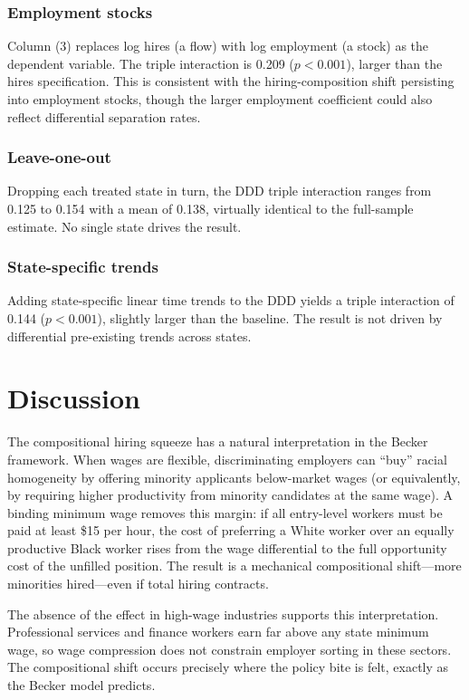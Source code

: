 \documentclass[12pt]{article}
\begin{document}
\subsubsection*{Employment stocks} Column (3) replaces log hires (a flow) with log employment (a stock) as the dependent variable. The triple interaction is 0.209 ($p < 0.001$), larger than the hires specification. This is consistent with the hiring-composition shift persisting into employment stocks, though the larger employment coefficient could also reflect differential separation rates.

\subsubsection*{Leave-one-out} Dropping each treated state in turn, the DDD triple interaction ranges from 0.125 to 0.154 with a mean of 0.138, virtually identical to the full-sample estimate. No single state drives the result.

\subsubsection*{State-specific trends} Adding state-specific linear time trends to the DDD yields a triple interaction of 0.144 ($p < 0.001$), slightly larger than the baseline. The result is not driven by differential pre-existing trends across states.


\section{Discussion}

The compositional hiring squeeze has a natural interpretation in the Becker framework. When wages are flexible, discriminating employers can ``buy'' racial homogeneity by offering minority applicants below-market wages (or equivalently, by requiring higher productivity from minority candidates at the same wage). A binding minimum wage removes this margin: if all entry-level workers must be paid at least \$15 per hour, the cost of preferring a White worker over an equally productive Black worker rises from the wage differential to the full opportunity cost of the unfilled position. The result is a mechanical compositional shift---more minorities hired---even if total hiring contracts.

The absence of the effect in high-wage industries supports this interpretation. Professional services and finance workers earn far above any state minimum wage, so wage compression does not constrain employer sorting in these sectors. The compositional shift occurs precisely where the policy bite is felt, exactly as the Becker model predicts.
\end{document}
